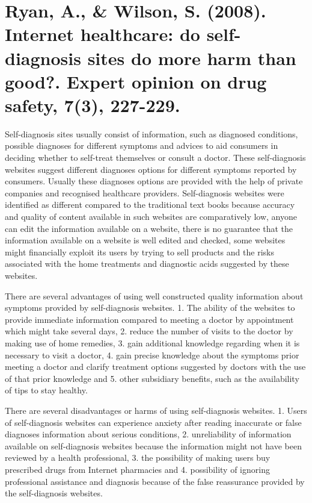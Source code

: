 \documentclass[]{article}
\begin{document}
\section{Ryan, A., \& Wilson, S. (2008). Internet healthcare: do self-diagnosis sites do more harm than good?. Expert opinion on drug safety, 7(3), 227-229.}

Self-diagnosis sites usually consist of information, such as diagnosed conditions, possible diagnoses for different symptoms and advices to aid consumers in deciding whether to self-treat themselves or consult a doctor. These self-diagnosis websites suggest different diagnoses options for different symptoms reported by consumers. Usually these diagnoses options are provided with the help of private companies and recognised healthcare providers. Self-diagnosis websites were identified as different compared to the traditional text books because  accuracy and quality of content available in such websites are comparatively low, anyone can edit the information available on a website, there is no guarantee that the information available on a website is well edited and checked, some websites might financially exploit its users by trying to sell products and the risks associated with the home treatments and diagnostic acids suggested by these websites. 

There are several advantages of using well constructed quality information about symptoms provided by self-diagnosis websites. 1. The ability of the websites to provide immediate information compared to meeting a doctor by appointment which might take several days, 2. reduce the number of visits to the doctor by making use of home remedies, 3. gain additional knowledge regarding when it is necessary to visit a doctor, 4. gain precise knowledge about the symptoms prior meeting a doctor and clarify treatment options suggested by doctors with the use of that prior knowledge and 5. other subsidiary benefits, such as the availability of tips to stay healthy. 

There are several disadvantages or harms of using self-diagnosis websites. 1. Users of self-diagnosis websites can experience anxiety after reading inaccurate or false diagnoses information about serious conditions, 2. unreliability of information available on self-diagnosis websites because the information might not have been reviewed by a health professional, 3. the possibility of making users buy prescribed drugs from Internet pharmacies and 4. possibility of ignoring professional assistance and diagnosis because of the false reassurance provided by the self-diagnosis websites.        
\end{document}
